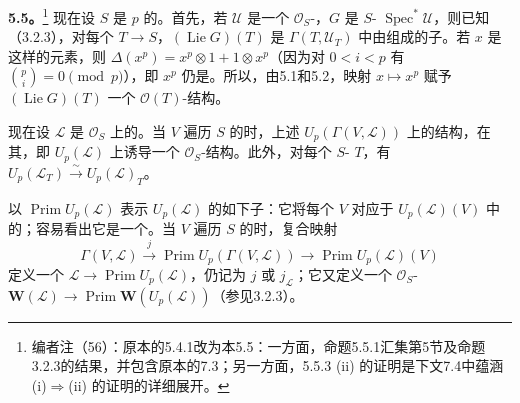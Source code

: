 \textbf{5.5。}\footnote{编者注（56）：原本的5.4.1改为本5.5：一方面，命题5.5.1汇集第5节及命题3.2.3的结果，并包含原本的7.3；另一方面，5.5.3 (ii) 的证明是下文7.4中蕴涵 (i)$\Rightarrow$(ii) 的证明的详细展开。}
现在设 $S$ 是 $p$ 的。首先，若 $\mathcal U$ 是一个 $\mathcal O_S$-，$G$ 是 $S$- $\operatorname{Spec}^*\mathcal U$，则已知（3.2.3），对每个 $T\to S$，$(\operatorname{Lie}G)(T)$ 是 $\Gamma(T,\mathcal U_T)$ 中由组成的子。若 $x$ 是这样的元素，则
$\Delta(x^p)=x^p\otimes1+1\otimes x^p$（因为对 $0<i<p$ 有 $\binom pi=0\pmod p$），即 $x^p$ 仍是。所以，由5.1和5.2，映射 $x\mapsto x^p$ 赋予 $(\operatorname{Lie}G)(T)$ 一个 $\mathcal O(T)$-结构。

现在设 $\mathcal L$ 是 $\mathcal O_S$ 上的。当 $V$ 遍历 $S$ 的时，上述 $U_p(\Gamma(V,\mathcal L))$ 上的结构，在其，即 $U_p(\mathcal L)$ 上诱导一个 $\mathcal O_S$-结构。此外，对每个 $S$- $T$，有 $U_p(\mathcal L_T)\xrightarrow{\sim}U_p(\mathcal L)_T$。

以 $\operatorname{Prim}U_p(\mathcal L)$ 表示 $U_p(\mathcal L)$ 的如下子：它将每个 $V$ 对应于 $U_p(\mathcal L)(V)$ 中的；容易看出它是一个。当 $V$ 遍历 $S$ 的时，复合映射
\[
 \Gamma(V,\mathcal L)\xrightarrow{j}\operatorname{Prim}U_p(\Gamma(V,\mathcal L))
 \longrightarrow\operatorname{Prim}U_p(\mathcal L)(V)
\]
定义一个 $\mathcal L\to\operatorname{Prim}U_p(\mathcal L)$，仍记为 $j$ 或 $j_{\mathcal L}$；它又定义一个 $\mathcal O_S$-
$\mathbf W(\mathcal L)\to\operatorname{Prim}\mathbf W(U_p(\mathcal L))$（参见3.2.3）。

